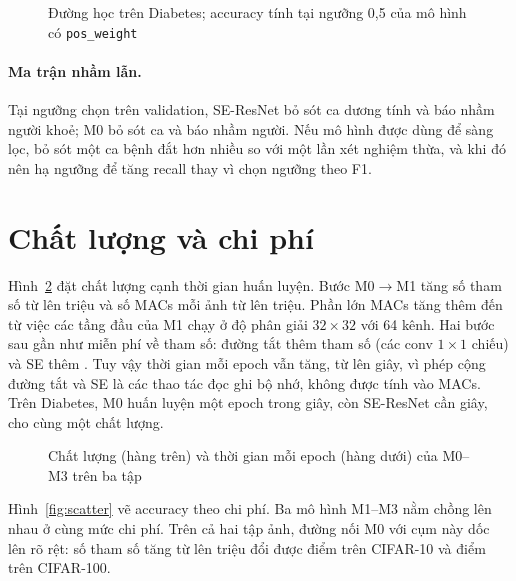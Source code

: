 \begin{figure}[H]
  \centering
  \caption{Đường học trên Diabetes; accuracy tính tại ngưỡng 0,5 của mô hình có \texttt{pos\_weight}}
  \label{fig:hocdiabetes}
\end{figure}

\paragraph{Ma trận nhầm lẫn.} Tại ngưỡng chọn trên validation, SE-ResNet bỏ sót 
ca dương tính và báo nhầm  người khoẻ; M0 bỏ sót
 ca và báo nhầm  người. Nếu mô hình được dùng
để sàng lọc, bỏ sót một ca bệnh đắt hơn nhiều so với một lần xét nghiệm thừa, và khi đó nên hạ ngưỡng để tăng recall thay vì
chọn ngưỡng theo F1.

\section{Chất lượng và chi phí}
\label{sec:chiphi}

Hình~\ref{fig:cot} đặt chất lượng cạnh thời gian huấn luyện. Bước M0$\to$M1 tăng số tham số từ
 lên  triệu và số MACs mỗi ảnh từ
 lên  triệu. Phần lớn MACs tăng thêm đến từ việc các tầng
đầu của M1 chạy ở độ phân giải $32\times32$ với 64 kênh. Hai bước sau gần như miễn phí về tham số: đường tắt thêm
 tham số (các conv $1\times1$ chiếu) và SE thêm
. Tuy vậy thời gian mỗi epoch vẫn tăng, từ 
lên  giây, vì phép cộng đường tắt và SE là các thao tác đọc ghi bộ nhớ, không được tính
vào MACs. Trên Diabetes, M0 huấn luyện một epoch trong  giây, còn SE-ResNet cần
 giây, cho cùng một chất lượng.

\begin{figure}[H]
  \centering
  \caption{Chất lượng (hàng trên) và thời gian mỗi epoch (hàng dưới) của M0--M3 trên ba tập}
  \label{fig:cot}
\end{figure}

Hình~\ref{fig:scatter} vẽ accuracy theo chi phí. Ba mô hình M1--M3 nằm chồng lên nhau ở cùng mức chi phí. Trên cả hai tập ảnh,
đường nối M0 với cụm này dốc lên rõ rệt: số tham số tăng từ  lên  triệu đổi được 
điểm trên CIFAR-10 và  điểm trên CIFAR-100.

